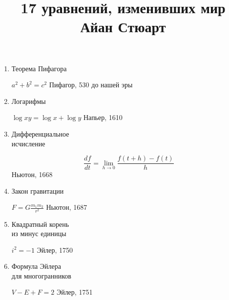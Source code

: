 \documentclass[a4paper, 12pt]{article}
\date{}
\title{\bf 17 уравнений, изменивших мир \\Айан Стюарт\\}
\begin{document}
 

\maketitle
\begin{enumerate}
 \item Теорема Пифагора \hfill \begin{minipage}[t]{80mm} $a^2+b^2 = c^2$ \hfill Пифагор, 530 до нашей эры \end{minipage}
 
 \item Логарифмы  \hfill \begin{minipage}[t]{80mm} $\log xy = \log x+\log y$ \hfill Напьер, 1610 \end{minipage} 
 
 \item \begin{minipage}[t]{15mm} Дифференциальное \\исчисление\\ \end{minipage} \hfill \begin{minipage}[t]{110mm} $$\frac{df}{dt} = \lim_{h\to 0}\frac {f(t+h)-f(t)}{h} $$ \hfill Ньютон, 1668 \end{minipage}
 
 \item   Закон гравитации \hfill \begin{minipage}[t]{80mm} $F = G \frac{m_1m_2}{r^2}$ \hfill Ньютон, 1687 \end{minipage}
 \item
 
  \noindent
  \begin{minipage}[t]{45mm} Квадратный корень \\из минус единицы\\ \end{minipage}
  \hfill
  \begin{minipage}[t]{100mm}  $i^2 = -1$ \hfill Эйлер, 1750 \end{minipage}
 \item
  \noindent
  \begin{minipage}[t]{45mm} Формула Эйлера \\для многогранников\\ \end{minipage}
  \hfill 
  \begin{minipage}[t]{100mm}  $V - E + F = 2$ \hfill Эйлер, 1751 \end{minipage}
  

\end{enumerate}
\end{document}
